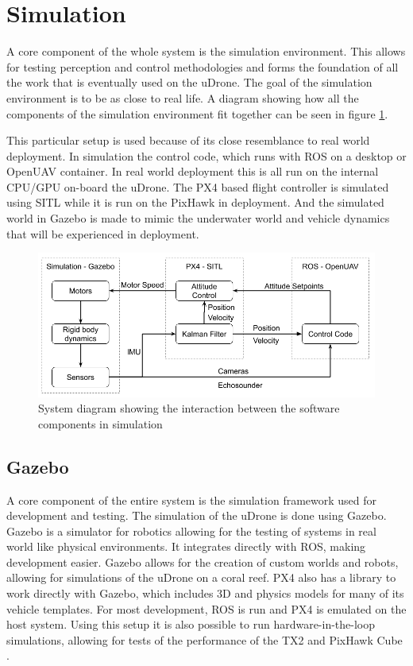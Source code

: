 \section{Simulation}
A core component of the whole system is the simulation environment. This allows for testing perception and control methodologies and forms the foundation of all the work that is eventually used on the uDrone. The goal of the simulation environment is to be as close to real life. A diagram showing how all the components of the simulation environment fit together can be seen in figure \ref{soft}. 

This particular setup is used because of its close resemblance to real world deployment. In simulation the control code, which runs with ROS on a desktop or OpenUAV container. In real world deployment this is all run on the internal CPU/GPU on-board the uDrone. The PX4 based flight controller is simulated using SITL while it is run on the PixHawk in deployment. And the simulated world in Gazebo is made to mimic the underwater world and vehicle dynamics that will be experienced in deployment. 

\begin{figure}
    \centering
    \includegraphics[width=\maxwidth{\textwidth}]{img/soft-sys.png}
    \caption{System diagram showing the interaction between the software components in simulation}
    \label{soft}
\end{figure}

\subsection{Gazebo}
A core component of the entire system is the simulation framework used for development and testing. The simulation of the uDrone is done using Gazebo. Gazebo is a simulator for robotics allowing for the testing of systems in real world like physical environments. It integrates directly with ROS, making development easier. Gazebo allows for the creation of custom worlds and robots, allowing for simulations of the uDrone on a coral reef. PX4 also has a library to work directly with Gazebo, which includes 3D and physics models for many of its vehicle templates. For most development, ROS is run and PX4 is emulated on the host system. Using this setup it is also possible to run hardware-in-the-loop simulations, allowing for tests of the performance of the TX2 and PixHawk Cube \parencite{gazebo}. 

